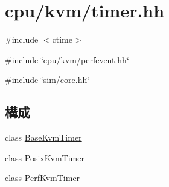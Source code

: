 \hypertarget{timer_8hh}{
\section{cpu/kvm/timer.hh}
\label{timer_8hh}
}
{\ttfamily \#include $<$ctime$>$}\par
{\ttfamily \#include \char`\"{}cpu/kvm/perfevent.hh\char`\"{}}\par
{\ttfamily \#include \char`\"{}sim/core.hh\char`\"{}}\par
\subsection*{構成}
\begin{DoxyCompactItemize}
\item 
class \hyperlink{classBaseKvmTimer}{BaseKvmTimer}
\item 
class \hyperlink{classPosixKvmTimer}{PosixKvmTimer}
\item 
class \hyperlink{classPerfKvmTimer}{PerfKvmTimer}
\end{DoxyCompactItemize}
